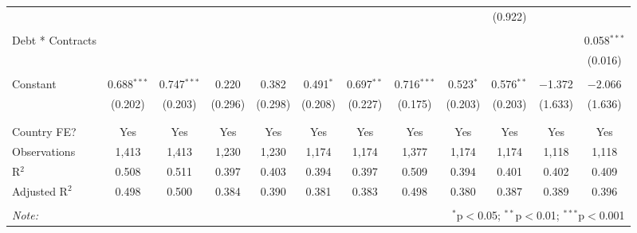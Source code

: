 \begin{table}[!htbp]
\begin{tabular}{@{\extracolsep{5pt}}lccccccccccc}
  &  &  &  &  &  &  &  &  & (0.922) &  &  \\ 
  & & & & & & & & & & & \\ 
 Debt * Contracts &  &  &  &  &  &  &  &  &  &  & 0.058$^{***}$ \\ 
  &  &  &  &  &  &  &  &  &  &  & (0.016) \\ 
  & & & & & & & & & & & \\ 
 Constant & 0.688$^{***}$ & 0.747$^{***}$ & 0.220 & 0.382 & 0.491$^{*}$ & 0.697$^{**}$ & 0.716$^{***}$ & 0.523$^{*}$ & 0.576$^{**}$ & $-$1.372 & $-$2.066 \\ 
  & (0.202) & (0.203) & (0.296) & (0.298) & (0.208) & (0.227) & (0.175) & (0.203) & (0.203) & (1.633) & (1.636) \\ 
  & & & & & & & & & & & \\ 
\hline \\[-1.8ex] 
Country FE? & Yes & Yes & Yes & Yes & Yes & Yes & Yes & Yes & Yes & Yes & Yes \\ 
Observations & 1,413 & 1,413 & 1,230 & 1,230 & 1,174 & 1,174 & 1,377 & 1,174 & 1,174 & 1,118 & 1,118 \\ 
R$^{2}$ & 0.508 & 0.511 & 0.397 & 0.403 & 0.394 & 0.397 & 0.509 & 0.394 & 0.401 & 0.402 & 0.409 \\ 
Adjusted R$^{2}$ & 0.498 & 0.500 & 0.384 & 0.390 & 0.381 & 0.383 & 0.498 & 0.380 & 0.387 & 0.389 & 0.396 \\ 
\hline 
\hline \\[-1.8ex] 
\textit{Note:}  & \multicolumn{11}{r}{$^{*}$p$<$0.05; $^{**}$p$<$0.01; $^{***}$p$<$0.001} \\ 
\end{tabular} 
\end{table} 
